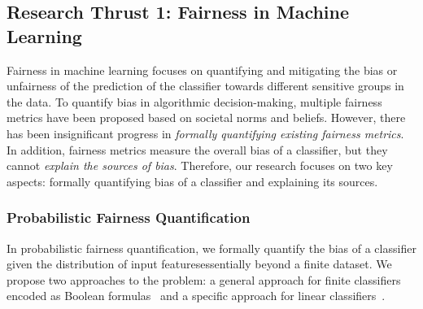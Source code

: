 \documentclass[10pt]{article}
\begin{document}
	
	
	
	
	\subsection*{Research Thrust 1: Fairness in Machine Learning}
	
	Fairness in machine learning focuses on quantifying and mitigating the  bias or unfairness of the prediction of the classifier towards different sensitive groups in the data. To quantify bias in algorithmic decision-making, multiple fairness metrics have been proposed based on societal norms and beliefs. However, there has been insignificant progress in \textit{formally quantifying existing fairness metrics}. In addition, fairness metrics measure the overall bias of a classifier, but they cannot  \textit{explain the sources of bias}. Therefore, our research focuses on two key aspects: formally quantifying bias of a classifier and explaining its sources.
	
	\subsubsection*{Probabilistic Fairness Quantification} In probabilistic fairness quantification, we formally quantify the bias of a classifier given the distribution of input features\textemdash essentially beyond a finite dataset. We propose two approaches to the problem: a general approach for finite classifiers encoded as Boolean formulas~\cite{ghosh2021justicia} and a specific approach for linear classifiers~\cite{ghosh2022algorithmic}.
	

	
	
\end{document}
